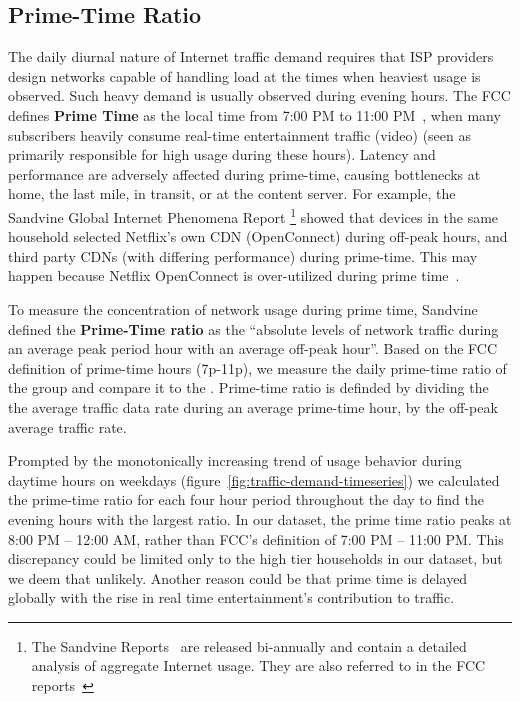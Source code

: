 \subsection{Prime-Time Ratio} \label{subsec:primetime}

The daily diurnal nature of Internet traffic demand requires that ISP providers 
design networks capable of handling load at the times when heaviest usage is 
observed. Such heavy demand is usually observed during evening hours.
The FCC defines \textbf{Prime Time} as the local time from 7:00 PM to 11:00
PM~\cite{fcc2014measuring-broadband}, when many subscribers heavily consume 
real-time entertainment traffic (video) (seen as primarily responsible for high 
usage during these hours). Latency and performance are adversely affected 
during prime-time, causing bottlenecks at home, the last mile, in
transit, or at the content server. For example, the Sandvine Global
Internet Phenomena Report \footnote{The Sandvine Reports ~\cite{sandvine20141h,
sandvine20142h}are released bi-annually and
contain a detailed analysis of aggregate Internet usage. They are also referred
to in the FCC reports~\cite{fcc2015progress-report, fcc2014measuring-broadband,
fcc2014progress-report}} showed that devices in the same household selected  
Netflix's
own CDN (OpenConnect) during off-peak hours, and third party CDNs (with differing
performance) during prime-time. This may happen because Netflix OpenConnect is  
over-utilized
during prime time~\cite{sandvine20141h}.

To measure the concentration of network usage during prime time,
Sandvine defined the \textbf{Prime-Time ratio} as the ``absolute levels of network traffic
during an average peak period hour with an average off-peak hour''. Based on the FCC
definition of prime-time hours (7p-11p), we measure the daily prime-time ratio of the \control{} group and compare it to the \treatment{}. Prime-time ratio is definded by dividing the the average traffic data rate during an average prime-time hour, by the off-peak average traffic rate.

Prompted by the monotonically increasing trend of usage behavior during daytime hours on
weekdays (figure~\ref{fig:traffic-demand-timeseries})
we calculated the prime-time ratio for each four hour period throughout the day
to find the evening hours with the largest ratio.
In our dataset, the prime time ratio peaks at 8:00 PM -- 12:00 AM,
rather than FCC's definition of 7:00 PM -- 11:00 PM. This discrepancy could be limited
only to the high tier households in our dataset, but we deem that unlikely.
Another reason could be that prime time is delayed globally with the rise in real
time entertainment's contribution to traffic.


